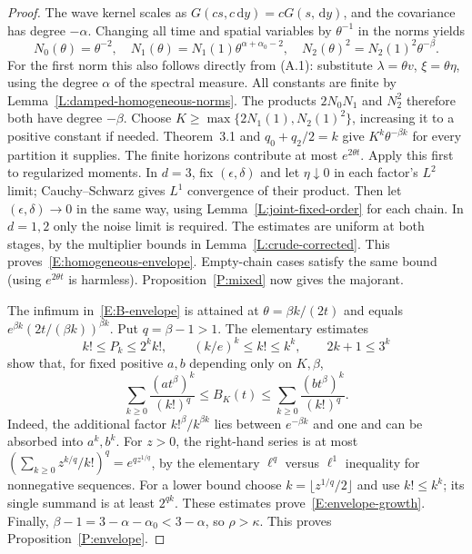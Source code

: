 \documentclass[12pt]{article}
\numberwithin{equation}{section}
\theoremstyle{definition}
\newcommand{\ud}{\,\mathrm{d}}
\begin{document}
\begin{proof}
  The wave kernel scales as
  $G(cs,c\ud y)=cG(s,\ud y)$, and the covariance has degree $-\alpha$.
  Changing all time and spatial variables by $\theta^{-1}$ in the norms
  yields
  \begin{equation}\label{E:homogeneous-norms}
    N_0(\theta)=\theta^{-2},\quad
    N_1(\theta)=N_1(1)\theta^{\alpha+\alpha_0-2},\quad
    N_2(\theta)^2=N_2(1)^2\theta^{-\beta}.
  \end{equation}
  For the first norm this also follows directly from (A.1): substitute
  $\lambda=\theta v$, $\xi=\theta\eta$, using the degree $\alpha$ of
  the spectral measure. All constants are finite by Lemma~\ref{L:damped-homogeneous-norms}.
  The products $2N_0N_1$ and $N_2^2$ therefore both have degree
  $-\beta$. Choose
  $K\ge\max\{2N_1(1),N_2(1)^2\}$, increasing it to a positive
  constant if needed. Theorem~3.1 and $q_0+q_2/2=k$ give
  $K^k\theta^{-\beta k}$ for every partition it supplies. The finite
  horizons contribute at most $e^{2\theta t}$. Apply this first to
  regularized moments. In $d=3$, fix $(\epsilon,\delta)$ and let
  $\eta\downarrow0$ in each factor's $L^2$ limit; Cauchy--Schwarz gives
  $L^1$ convergence of their product. Then let
  $(\epsilon,\delta)\to0$ in the same way, using Lemma~\ref{L:joint-fixed-order} for each
  chain. In $d=1,2$ only the noise limit is required. The estimates are
  uniform at both stages, by the multiplier bounds in
  Lemma~\ref{L:crude-corrected}. This proves~\eqref{E:homogeneous-envelope}.
  Empty-chain cases satisfy the same bound (using $e^{2\theta t}$ is
  harmless). Proposition~\ref{P:mixed} now gives the majorant.

  The infimum in~\eqref{E:B-envelope} is attained at
  $\theta=\beta k/(2t)$ and equals
  $e^{\beta k}(2t/(\beta k))^{\beta k}$. Put $q=\beta-1>1$.
  The elementary estimates
  \[
    k!\le P_k\le2^k k!,\qquad
    (k/e)^k\le k!\le k^k,\qquad 2k+1\le3^k
  \]
  show that, for fixed positive $a,b$ depending only on $K,\beta$,
  \[
    \sum_{k\ge0}\frac{(at^\beta)^k}{(k!)^q}
    \le B_K(t)\le
    \sum_{k\ge0}\frac{(bt^\beta)^k}{(k!)^q}.
  \]
  Indeed, the additional factor $k!^\beta/k^{\beta k}$ lies between
  $e^{-\beta k}$ and one and can be absorbed into $a^k,b^k$.
  For $z>0$, the right-hand series is at most
  $(\sum_{k\ge0}z^{k/q}/k!)^q=e^{qz^{1/q}}$, by the elementary
  $\ell^q$ versus $\ell^1$ inequality for nonnegative sequences.
  For a lower bound choose $k=\lfloor z^{1/q}/2\rfloor$ and use
  $k!\le k^k$; its single summand is at least $2^{qk}$.
  These estimates prove~\eqref{E:envelope-growth}. Finally,
  $\beta-1=3-\alpha-\alpha_0<3-\alpha$, so $\rho>\kappa$.
  This proves Proposition~\ref{P:envelope}.
\end{proof}
\end{document}
